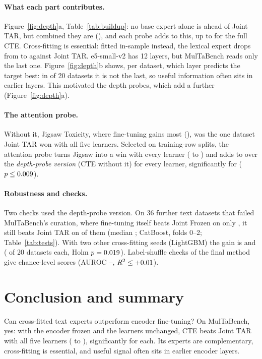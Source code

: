 \documentclass{article}
\begin{document}
\paragraph{What each part contributes.}
Figure~\ref{fig:depth}a, Table~\ref{tab:buildup}: no base expert alone is ahead of Joint TAR, but combined they are
(\bucte), and each probe adds to this, up to \buattn{} for the full CTE. Cross-fitting is essential: fitted in-sample
instead, the lexical expert drops from \bulex{} to \bulexIn{} against Joint TAR. e5-small-v2 has 12 layers, but MulTaBench reads only the last one. Figure~\ref{fig:depth}b shows, per dataset, which layer predicts the target best: in \depthInner{} of 20
datasets it is not the last, so useful information often sits in earlier layers. This motivated
the depth probes, which add a further \buDepthAdd{} (Figure~\ref{fig:depth}a).

\paragraph{The attention probe.}
Without it, Jigsaw Toxicity, where fine-tuning gains most (\jigsawTarGain), was the one dataset
Joint TAR won with all five learners. Selected on training-row splits, the attention probe turns Jigsaw into
a win with every learner (\jigsawNewMin{} to \jigsawNewMax) and adds \attnIncPosMin{} to \attnIncPosMax{} over the
\emph{depth-probe version} (CTE without it) for every learner, significantly for \attnIncSigN{} ($p \le
0.009$).

\paragraph{Robustness and checks.}
Two checks used the depth-probe version. On 36 further text datasets that failed MulTaBench's curation, where
fine-tuning itself beats Joint Frozen on only \cSevenTarOverFrozen, it still beats Joint TAR on \cSevenWins{} of
them (median \cSevenMedian; CatBoost, folds 0--2; Table~\ref{tab:tests}). With two other
cross-fitting seeds (LightGBM) the gain is \seedGainA{} and \seedGainB{} (\seedWinsA{} of 20 datasets each, Holm $p =
0.019$). Label-shuffle checks of the final method give chance-level scores (AUROC
\shuffleMin--\shuffleMax, $R^2 \le +0.01$).

\section{Conclusion and summary}
\label{sec:conclusion}
Can cross-fitted text experts outperform encoder fine-tuning? On MulTaBench, yes: with the encoder frozen and the
learners unchanged, CTE beats Joint TAR with all five learners (\gainMin{} to \gainMax{}), significantly for each.
Its experts are complementary, cross-fitting is essential, and useful signal often sits in earlier encoder layers.
\end{document}
